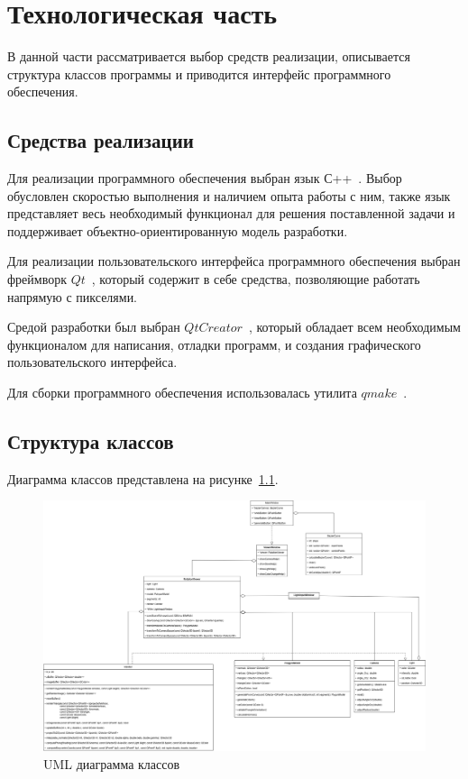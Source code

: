 \chapter{Технологическая часть}

В данной части рассматривается выбор средств реализации, описывается структура классов программы и приводится интерфейс программного
обеспечения.

\section{Средства реализации}

Для реализации программного обеспечения выбран язык С++~\cite{cpp}. Выбор обусловлен скоростью выполнения и наличием опыта работы с ним, также язык представляет весь необходимый функционал для решения поставленной задачи и поддерживает объектно-ориентированную модель разработки.

Для реализации пользовательского интерфейса программного обеспечения выбран фреймворк $Qt$~\cite{qt}, который содержит в себе средства, позволяющие работать напрямую с пикселями.

Средой разработки был выбран $Qt Creator$~\cite{qt_creator}, который обладает всем необходимым функционалом для написания, отладки программ, и создания графического пользовательского интерфейса.

Для сборки программного обеспечения использовалась утилита $qmake$~\cite{qmake}.

\clearpage

\section{Структура классов}

Диаграмма классов представлена на рисунке~\ref{fig:uml}.

\begin{figure}[H]
    \centering
    \includegraphics[width=1\linewidth]{images/diograms/uml.png}
    \caption{UML диаграмма классов}
    \label{fig:uml}
\end{figure}

